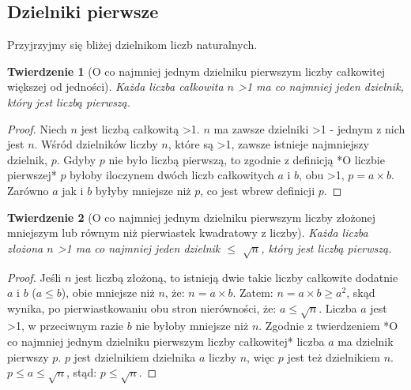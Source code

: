 \documentclass[10pt,onecolumn]{article}
\newtheorem{theorem}{Twierdzenie}
\theoremstyle{definition}
\theoremstyle{hypothesis}
\theoremstyle{capability}
\begin{document}
\subsection{Dzielniki pierwsze}

Przyjrzyjmy się bliżej dzielnikom liczb naturalnych.

\begin{theorem} [O co najmniej jednym dzielniku pierwszym liczby całkowitej większej od jedności]
Każda liczba całkowita $n$ \textgreater 1 ma co najmniej jeden dzielnik, który jest liczbą pierwszą. 
\end{theorem}
 
\begin{proof}
Niech $n$ jest liczbą całkowitą \textgreater 1. $n$ ma zawsze dzielniki \textgreater 1 - jednym z nich jest $n$.  Wśród dzielników liczby $n$, które są \textgreater 1, zawsze istnieje najmniejszy dzielnik, $p$. Gdyby $p$ nie było liczbą pierwszą, to zgodnie z definicją *O liczbie pierwszej* $p$ byłoby iloczynem dwóch liczb całkowitych $a$ i $b$, obu \textgreater 1, $p = a \times b$. Zarówno $a$ jak i $b$ byłyby mniejsze niż $p$, co jest wbrew definicji $p$.
\end{proof}

\begin{theorem} [O co najmniej jednym dzielniku pierwszym liczby złożonej mniejszym lub równym niż pierwiastek kwadratowy z liczby]
Każda liczba złożona $n$ \textgreater 1 ma co najmniej jeden dzielnik $\le$ $\sqrt{n}$, który jest liczbą pierwszą. 
\end{theorem}
 
\begin{proof}
Jeśli $n$ jest liczbą złożoną, to istnieją dwie takie liczby całkowite dodatnie $a$ i $b$ ($a \leq b$), obie mniejsze niż $n$, że: $n = a \times b$. Zatem: $n = a \times b \geq a^2$, skąd wynika, po pierwiastkowaniu obu stron nierówności, że: $a \leq \sqrt{n}$. Liczba $a$ jest \textgreater 1, w przeciwnym razie $b$ nie byłoby mniejsze niż $n$. Zgodnie z twierdzeniem *O co najmniej jednym dzielniku pierwszym liczby całkowitej* liczba $a$ ma dzielnik pierwszy $p$. $p$ jest dzielnikiem dzielnika $a$ liczby $n$, więc $p$ jest też dzielnikiem $n$. $p \leq a \leq \sqrt{n}$, stąd: $p \leq \sqrt{n}$.
\end{proof}

\newpage

\end{document}
